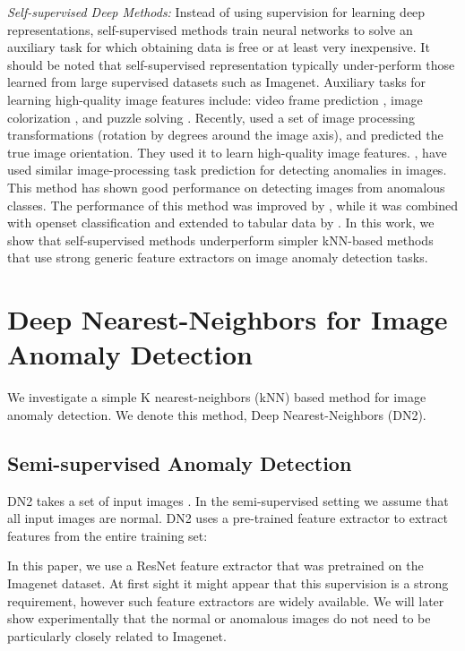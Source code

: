 \documentclass{article}
\begin{document}
\textit{Self-supervised Deep Methods:} Instead of using supervision for learning deep representations, self-supervised methods train neural networks to solve an auxiliary task for which obtaining data is free or at least very inexpensive. It should be noted that self-supervised representation typically under-perform those learned from large supervised datasets such as Imagenet. Auxiliary tasks for learning high-quality image features include: video frame prediction \citep{mathieu2015deep}, image colorization \citep{zhang2016colorful, larsson2016learning}, and puzzle solving \citep{noroozi2016unsupervised}. Recently, \citet{gidaris2018unsupervised} used a set of image processing transformations (rotation by  degrees around the image axis), and predicted the true image orientation. They used it to learn high-quality image features. \citet{golan2018deep}, have used similar image-processing task prediction for detecting anomalies in images. This method has shown good performance on detecting images from anomalous classes. The performance of this method was improved by \citet{hendrycks2019using}, while it was combined with openset classification and extended to tabular data by \citet{bergman2020classification}. In this work, we show that self-supervised methods underperform simpler kNN-based methods that use strong generic feature extractors on image anomaly detection tasks.  

\section{Deep Nearest-Neighbors for Image Anomaly Detection}
\label{sec:method}

We investigate a simple K nearest-neighbors (kNN) based method for image anomaly detection. We denote this method, Deep Nearest-Neighbors (DN2).

\subsection{Semi-supervised Anomaly Detection}
\label{subsec:semi-supervised}

DN2 takes a set of input images . In the semi-supervised setting we assume that all input images are normal. DN2 uses a pre-trained feature extractor  to extract features from the entire training set:


In this paper, we use a ResNet feature extractor that was pretrained on the Imagenet dataset. At first sight it might appear that this supervision is a strong requirement, however such feature extractors are widely available. We will later show experimentally that the normal or anomalous images do not need to be particularly closely related to Imagenet. 
\end{document}
